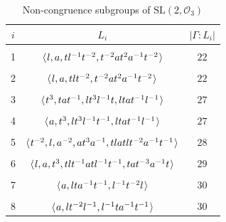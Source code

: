 \documentclass[11pt]{amsart}
\theoremstyle{definition}
\theoremstyle{remark}
\newcommand{\G}{{\Gamma}}
\newcommand{\SL}{\mathrm{SL}}
\begin{document}
\begin{table}[h!]
 \begin{center}
 \caption{Non-congruence subgroups of $\SL(2, \mathcal{O}_3)$}
 \label{tab:table2}
 \begin{tabular}{|c|c|c|} \hline
$i$ & $L_i$ & $|\G : L_i|$ \\
 \hline
\vspace{-12pt} & &   \\
1&$\langle \hspace{.75pt} l, a, tl^{-1}t^{-2}, t^{-2}at^{2}a^{-1}t^{-2} \hspace{.75pt} \rangle$& $22$\\
\vspace{-12pt} & &   \\
2&$\langle \hspace{.75pt} l, a, tlt^{-2}, t^{-2}at^{2}a^{-1}t^{-2}  \hspace{.75pt} \rangle$&$22$\\
\vspace{-12pt} & &   \\
3&$\langle \hspace{.75pt} t^{3}, tat^{-1}, lt^{3}l^{-1}t, ltat^{-1}l^{-1} \hspace{.75pt} \rangle$&$27$\\
\vspace{-12pt} & &   \\
4&$\langle \hspace{.75pt} a, t^{3}, lt^{3}l^{-1}t^{-1}, ltat^{-1}l^{-1}  \hspace{.75pt} \rangle$&$27$\\
\vspace{-12pt} & &   \\
5&$\langle \hspace{.75pt} t^{-2}, l, a^{-2}, at^{3}a^{-1}, tlatlt^{-2}a^{-1}t^{-1} \hspace{.75pt} \rangle$&$28$\\
\vspace{-12pt} & &   \\
6&$\langle \hspace{.75pt} l, a, t^{3}, tlt^{-1}atl^{-1}t^{-1}, tat^{-3}a^{-1}t  \hspace{.75pt} \rangle$&$29$\\
\vspace{-12pt} & &   \\
7&$\langle \hspace{.75pt} a, lta^{-1}t^{-1}, l^{-1}t^{-2}l  \hspace{.75pt} \rangle$&$30$\\
\vspace{-12pt} & &   \\
8&$\langle \hspace{.75pt} a, lt^{-2}l^{-1}, l^{-1}ta^{-1}t^{-1}  \hspace{.75pt} \rangle$&$30$\\
                \hline
    \end{tabular}
  \end{center}
\end{table}
\end{document}
